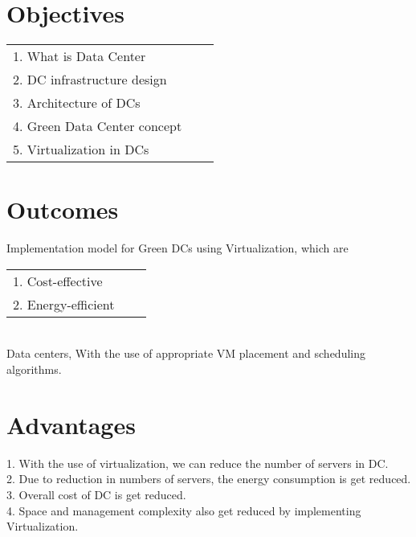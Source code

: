 \documentclass[12pt,a4paper]{report}
\begin{document}
\section{Objectives }
\begin{tabular}{lll}
\vspace{0.1 in}
1.	What is Data Center & \\
\vspace{0.1 in}
2.	DC infrastructure design & \\
\vspace{0.1 in}
3.	Architecture of DCs & \\
\vspace{0.1 in}
4.	Green Data Center concept & \\
\vspace{0.1 in}
5.	Virtualization in DCs & \\
\end{tabular}



 \section{Outcomes }
Implementation model for Green DCs using Virtualization, which are\\
\begin{tabular}{lll}
\vspace*{0.1 in}
1.	Cost-effective &\\
\vspace*{0.1 in}
2.	Energy-efficient &\\
\end{tabular}
\\Data centers, With the use of appropriate VM placement and scheduling algorithms. 

\section{Advantages }
1.	With the use of  virtualization, we can reduce the number of servers in DC.\\
2.	Due to reduction in numbers of servers, the energy consumption is get reduced.\\
3.	Overall cost of DC is get reduced.\\
4.	Space and management complexity also get reduced by implementing Virtualization.\\



	


\end{document}
